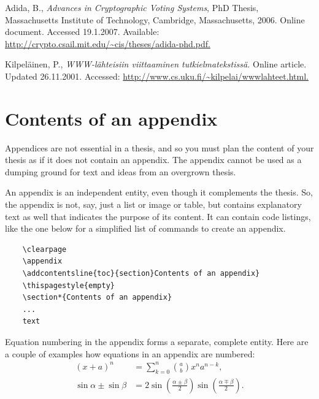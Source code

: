 \documentclass[english, 12pt, a4paper, elec, utf8, a-2b, online]{aaltothesis}
\begin{document}
\begin{thebibliography}{99}
   Adida, B., \textit{Advances in Cryptographic Voting Systems}, 
	PhD Thesis, Massachusetts Institute of Technology, Cambridge, Massachusetts,
	2006. Online document. Accessed 19.1.2007. Available: 
	\url{http://crypto.csail.mit.edu/~cis/theses/adida-phd.pdf.}

   Kilpeläinen, P., 
    \textit{\foreignlanguage{finnish}{WWW-lähteisiin viittaaminen 
    		tutkielmatekstissä}.} Online article. Updated 26.11.2001. 
	Accessed: \url{http://www.cs.uku.fi/~kilpelai/wwwlahteet.html.}

\end{thebibliography}

\clearpage

\thesisappendix

\section{Contents of an appendix}
\label{app:contents}

Appendices are not essential in a thesis, and so you must plan the content of 
your thesis as if it does not contain an appendix. The appendix cannot be used 
as a dumping ground for text and ideas from an overgrown thesis.

An appendix is an independent entity, even though it complements the thesis. 
So, the appendix is not, say, just a list or image or table, but contains 
explanatory text as well that indicates the purpose of its content. It can 
contain code listings, like the one below for a simplified list of commands to 
create an appendix.
\begin{verbatim}
	\clearpage
	\appendix
	\addcontentsline{toc}{section}Contents of an appendix}
	\thispagestyle{empty}
	\section*{Contents of an appendix}
	...
	text
\end{verbatim}

Equation numbering in the appendix forms a separate, complete entity. Here are a couple of examples how equations in an appendix are numbered:
\begin{align}
	(x+a)^n &= \sum_{k=0}^n \binom{a}{b} x^n a^{n-k}, \label{appeq:1}\\
	\sin\alpha \pm \sin\beta &= 2\sin\left(\frac{\alpha\pm\beta}{2}\right)
	\sin\left(\frac{\alpha\mp\beta}{2}\right). \label{liitekaava2}
\end{align}
\end{document}
